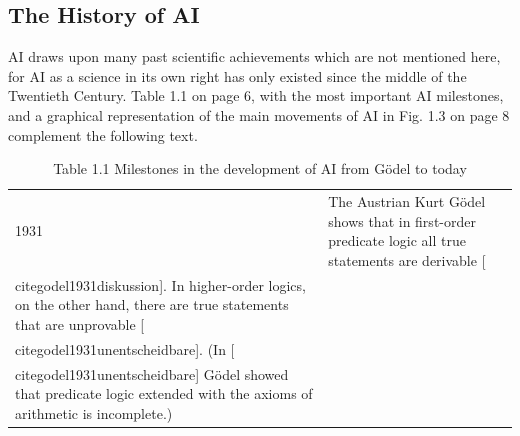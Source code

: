 \documentclass[10pt]{book}
\begin{document}
\subsection*{The History of AI}
AI draws upon many past scientific achievements which are not mentioned here, for AI as a science in its own right has only existed since the middle of the Twentieth Century. Table 1.1 on page 6, with the most important AI milestones, and a graphical representation of the main movements of AI in Fig. 1.3 on page 8 complement the following text.

\begin{table}[htbp]
\begin{center}
\captionsetup{labelformat=empty}
\caption{Table 1.1 Milestones in the development of AI from Gödel to today}
\begin{tabular}{|l|l|}
\hline
1931 & The Austrian Kurt Gödel shows that in first-order predicate logic all true statements are derivable [\\cite{godel1931diskussion}]. In higher-order logics, on the other hand, there are true statements that are unprovable [\\cite{godel1931unentscheidbare}]. (In [\\cite{godel1931unentscheidbare}] Gödel showed that predicate logic extended with the axioms of arithmetic is incomplete.) \\


\end{tabular}
\end{center}
\end{table}
\end{document}
